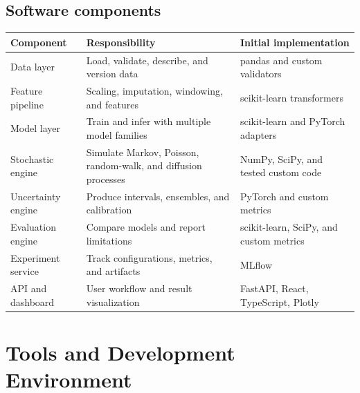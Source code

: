 \documentclass[11pt,a4paper]{report}
\begin{document}
\section{Software components}
\begin{longtable}{p{3.2cm}p{5cm}p{5.5cm}}
\toprule Component & Responsibility & Initial implementation \\
\midrule
Data layer & Load, validate, describe, and version data & pandas and custom validators \\
Feature pipeline & Scaling, imputation, windowing, and features & scikit-learn transformers \\
Model layer & Train and infer with multiple model families & scikit-learn and PyTorch adapters \\
Stochastic engine & Simulate Markov, Poisson, random-walk, and diffusion processes & NumPy, SciPy, and tested custom code \\
Uncertainty engine & Produce intervals, ensembles, and calibration & PyTorch and custom metrics \\
Evaluation engine & Compare models and report limitations & scikit-learn, SciPy, and custom metrics \\
Experiment service & Track configurations, metrics, and artifacts & MLflow \\
API and dashboard & User workflow and result visualization & FastAPI, React, TypeScript, Plotly \\
\bottomrule
\end{longtable}

\chapter{Tools and Development Environment}
\end{document}
